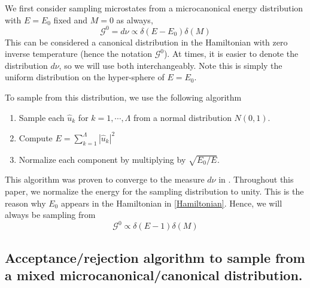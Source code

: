 \documentclass[12pt]{article}
\newcommand{\abs}[1]{\left| #1 \right|}
\newcommand{\uhat}{\hat{u}}
\newcommand{\sumk}{\sum_{k=1}^{\Lambda}}
\newcommand{\Gibbs}{\mathcal{G}}
\begin{document}
We first consider sampling microstates from a microcanonical energy distribution with $E=E_0$ fixed and $M=0$ as always,
\begin{equation}
\Gibbs^0 = d\nu \propto \delta(E-E_0) \delta(M)
\end{equation}
This can be considered a canonical distribution in the Hamiltonian with zero inverse temperature (hence the notation $\Gibbs^0$). At times, it is easier to denote the distribution $d\nu$, so we will use both interchangeably. Note this is simply the uniform distribution on the hyper-sphere of $E=E_0$.

To sample from this distribution, we use the following algorithm
\begin{enumerate}
\item Sample each $\uhat_k$ for $k=1,\cdots,\Lambda$ from a normal distribution $N(0,1)$.
\item Compute $E = \sumk \abs{\uhat_k}^2$
\item Normalize each component by multiplying by $\sqrt{E_0/E}$.
\end{enumerate}
This algorithm was proven to converge to the measure $d\nu$ in \cite{abramov2003hamiltonian}. Throughout this paper, we normalize the energy for the sampling distribution to unity. This is the reason why $E_0$ appears in the Hamiltonian in \eqref{Hamiltonian}. Hence, we will always be sampling from
\begin{equation}
\Gibbs^0 \propto \delta(E-1) \delta(M)
\end{equation}

\subsection{Acceptance/rejection algorithm to sample from a mixed microcanonical/canonical distribution.}
\end{document}
